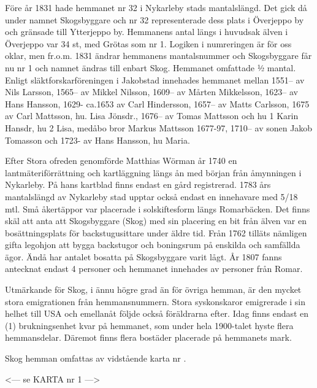 
Före år 1831 hade hemmanet nr 32 i Nykarleby stads mantalslängd. Det gick då under namnet Skogsbyggare och nr 32 representerade dess plats i Överjeppo by och gränsade till Ytterjeppo by. Hemmanens antal längs i huvudsak älven i Överjeppo var 34 st, med Grötas som nr 1. Logiken i numreringen är för oss oklar, men fr.o.m. 1831 ändrar hemmanens mantalsnummer och Skogsbyggare får nu nr 1 och namnet ändras till enbart Skog. Hemmanet omfattade ½ mantal. Enligt släktforskarföreningen i Jakobstad innehades hemmanet mellan 1551-- av Nils Larsson, 1565-- av Mikkel Nilsson, 1609-- av Mårten Mikkelsson, 1623-- av Hans Hansson, 1629- ca.1653 av Carl Hindersson, 1657-- av Matts Carlsson, 1675 av  Carl Mattsson, hu. Lisa Jönsdr., 1676-- av Tomas Mattsson och hu 1 Karin Hansdr, hu 2 Lisa, medåbo bror Markus Mattsson 1677-97, 1710-- av sonen Jakob Tomasson och 1723- av Hans Hansson, hu Maria.

Efter Stora ofreden genomförde Matthias Wörman år 1740 en lantmäteriförrättning och kartläggning längs ån med början från åmynningen i Nykarleby. På hans kartblad finns endast en gård registrerad. 1783 års mantalslängd av Nykarleby stad upptar också endast en innehavare med 5/18 mtl. Små åkertäppor var placerade i solskiftesform längs Romarbäcken. Det finns skäl att anta att Skogsbyggare (Skog) med sin placering en bit från älven var en bosättningsplats för backstugusittare under äldre tid. Från 1762 tilläts nämligen gifta legohjon att bygga backstugor och boningsrum på enskilda och samfällda ägor. Ändå har antalet bosatta på Skogsbyggare varit lågt. År 1807 fanns antecknat endast 4 personer och hemmanet innehades av personer från Romar.

Utmärkande för Skog, i ännu högre grad än för övriga hemman, är den mycket stora emigrationen från hemmansnummern. Stora syskonskaror emigrerade i sin helhet till USA och emellanåt följde också föräldrarna efter. Idag finns endast en (1) brukningsenhet kvar på hemmanet, som under hela 1900-talet hyste flera hemmansdelar. Däremot finns flera bostäder placerade på hemmanets mark.

Skog hemman omfattas av vidstående karta nr .


<--- se KARTA nr 1 --->





